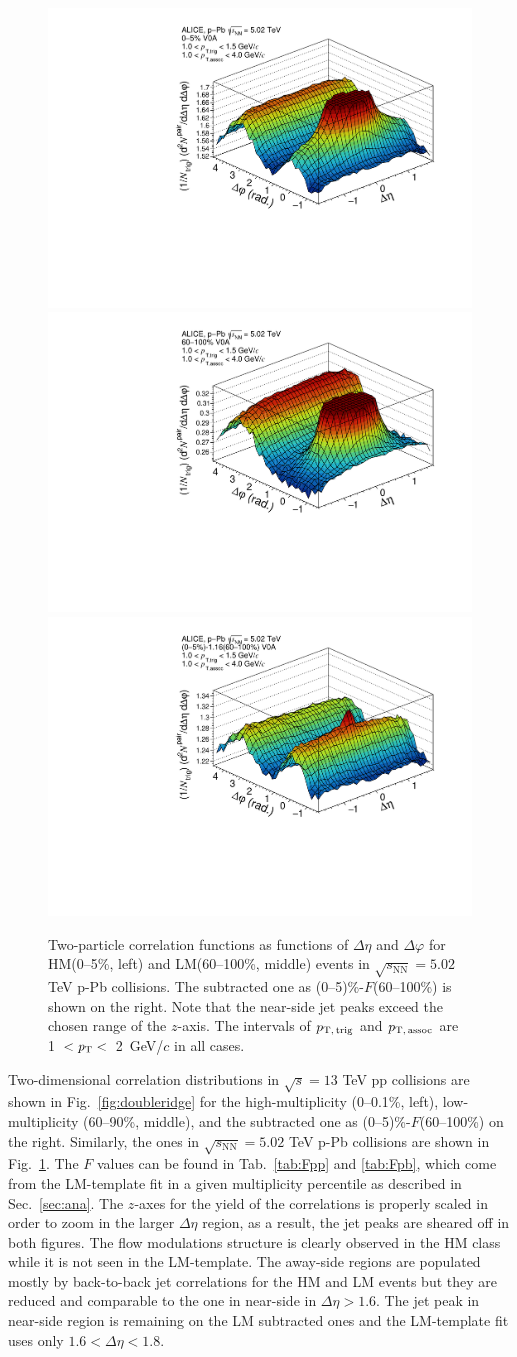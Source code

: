 \begin{figure}[h!]
			\includegraphics[width=0.33 \textwidth]{figures/corr_1_0_6.pdf}
			\includegraphics[width=0.33 \textwidth]{figures/corr_1_5_6.pdf}
			\includegraphics[width=0.33 \textwidth]{figures/corr_sub_temp_1_0_6.pdf}
\caption{Two-particle correlation functions as functions of $\Delta\eta$ and $\Delta\varphi$ for HM(0--5\%, left) and LM(60--100\%, middle) events in $\sqrt{s_{\mathrm{NN}}}=5.02$ TeV p-Pb collisions. The subtracted one as (0--5)\%-$F$(60--100\%) is shown on the right. Note that the near-side jet peaks exceed the chosen range of the $z$-axis. The intervals of $p_\mathrm{T,\,trig}$ and $p_\mathrm{T,\,assoc}$ are 1~$<\it{p}_{\rm{T}}<$~2~GeV/$c$ in all cases.}
\label{fig:doubleridgepPb}
\end{figure}

Two-dimensional correlation distributions in $\sqrt{s}=13$ TeV pp collisions are shown in Fig.~\ref{fig:doubleridge} for the high-multiplicity (0--0.1\%, left), low-multiplicity (60--90\%, middle), and the subtracted one as (0--5)\%-$F$(60--100\%) on the right. Similarly, the ones in $\sqrt{s_{\mathrm{NN}}}=5.02$ TeV p-Pb collisions are shown in Fig.~\ref{fig:doubleridgepPb}. The $F$ values can be found in Tab.~\ref{tab:Fpp} and \ref{tab:Fpb}, which come from the LM-template fit in a given multiplicity percentile as described in Sec.~\ref{sec:ana}. 
The $z$-axes for the yield of the correlations is properly scaled in order to zoom in the larger $\Delta\eta$ region, as a result, the jet peaks are sheared off in both figures. The flow modulations structure is clearly observed in the HM class while it is not seen in the LM-template. The away-side regions are populated mostly by back-to-back jet correlations for the HM and LM events but they are reduced and comparable to the one in near-side in $\Delta\eta > 1.6$. The jet peak in near-side region is remaining on the LM subtracted ones and the LM-template fit uses only $1.6< \Delta\eta < 1.8$.

